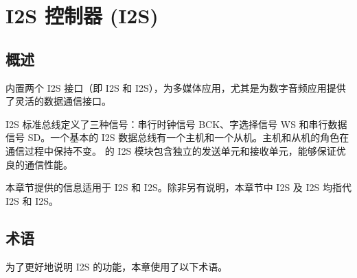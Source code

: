 \documentclass[main\_\_CN.tex]{subfiles}
\begin{document}

\ifglobal
\else
    {\let\clearpage\relax \listoftodos}
    \tableofcontents
\fi



\hypertarget{i2s}{}
\chapter{I2S 控制器 (I2S)}
\label{mod:i2s}

\section{概述}
\chipname{} 内置两个 I2S 接口（即 I2S 和 I2S），为多媒体应用，尤其是为数字音频应用提供了灵活的数据通信接口。


I2S 标准总线定义了三种信号：串行时钟信号 BCK、字选择信号 WS 和串行数据信号 SD。一个基本的 I2S 数据总线有一个主机和一个从机。主机和从机的角色在通信过程中保持不变。\chipname{} 的 I2S 模块包含独立的发送单元和接收单元，能够保证优良的通信性能。

\begin{tiplisting}
本章节提供的信息适用于 I2S 和 I2S。除非另有说明，本章节中 I2S 及 I2S 均指代 I2S 和 I2S。
\end{tiplisting}

\section{术语}

为了更好地说明 I2S 的功能，本章使用了以下术语。
\end{document}
